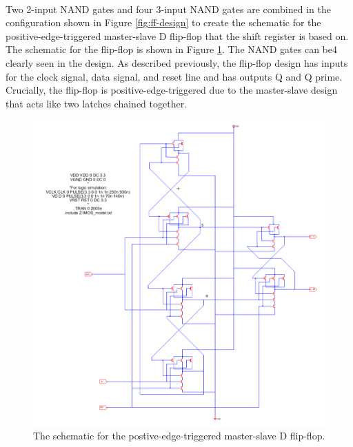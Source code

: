 \documentclass{article}
\begin{document}
  \paragraph{}
  Two 2-input NAND gates and four 3-input NAND gates are combined in the configuration shown in Figure \ref{fig:ff-design} to create the schematic for the positive-edge-triggered master-slave D flip-flop that the shift register is based on. The schematic for the flip-flop is shown in Figure \ref{fig:d-ff-schem}. The NAND gates can be4 clearly seen in the design. As described previously, the flip-flop design has inputs for the clock signal, data signal, and reset line and has outputs Q and Q prime. Crucially, the flip-flop is positive-edge-triggered due to the master-slave design that acts like two latches chained together.


  \begin{figure}[H]
    \centering
    \includegraphics[width=0.9\linewidth, frame]{screenshots/d-ff-schem.png}
    \caption{The schematic for the postive-edge-triggered master-slave D flip-flop.}
    \label{fig:d-ff-schem}
  \end{figure}

  \paragraph{}
\end{document}
